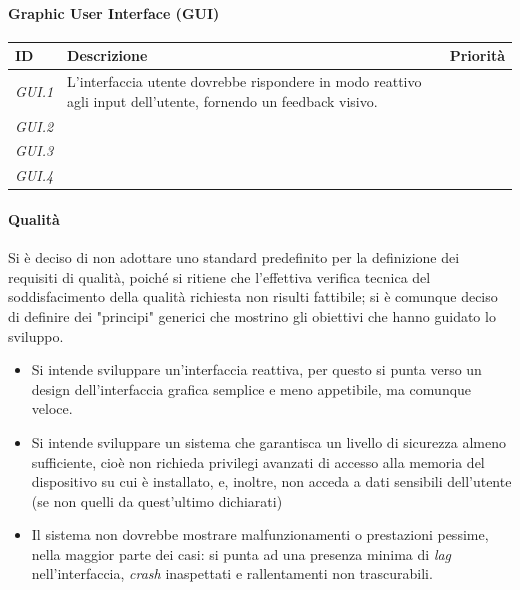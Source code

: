 \documentclass{article}
\newcommand{\should}{\cellcolor{LimeGreen}{S}}
\begin{document}
\paragraph{Graphic User Interface (GUI)}
\begin{center}
    \begin{tabular}{p{50pt}p{250pt}c}
    \toprule
        ID & Descrizione & Priorità \\
        \midrule
         \textit{GUI.1} & L'interfaccia utente dovrebbe rispondere in modo reattivo agli input dell'utente, fornendo un feedback visivo. & \should \\
         \textit{GUI.2} & &  \\
         \textit{GUI.3} & &  \\
         \textit{GUI.4} & &  \\
         \bottomrule
    \end{tabular} 
\end{center}

\paragraph{Qualità}
Si è deciso di non adottare uno standard predefinito per la definizione dei requisiti di qualità, poiché si ritiene che l'effettiva verifica tecnica del soddisfacimento della qualità richiesta non risulti fattibile; si è comunque deciso di definire dei "principi" generici che mostrino gli obiettivi che hanno guidato lo sviluppo.

\begin{itemize}
    \item Si intende sviluppare un'interfaccia reattiva, per questo si punta verso un design dell'interfaccia grafica semplice e meno appetibile, ma comunque veloce. 
    \item Si intende sviluppare un sistema che garantisca un livello di sicurezza almeno sufficiente, cioè non richieda privilegi avanzati di accesso alla memoria del dispositivo su cui è installato, e, inoltre, non acceda a dati sensibili dell'utente (se non quelli da quest'ultimo dichiarati)
    \item Il sistema non dovrebbe mostrare malfunzionamenti o prestazioni pessime, nella maggior parte dei casi: si punta ad una presenza minima di \textit{lag} nell'interfaccia, \textit{crash} inaspettati e rallentamenti non trascurabili. 
\end{itemize}
\end{document}
